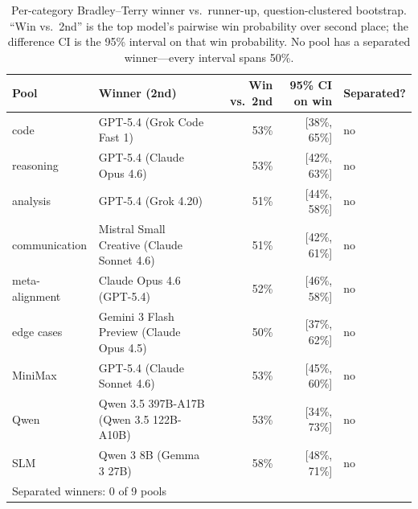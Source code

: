 \begin{table}[h]\centering\small
\caption{Per-category Bradley--Terry winner vs.\ runner-up, question-clustered bootstrap. ``Win vs.\ 2nd'' is the top model's pairwise win probability over second place; the difference CI is the 95\% interval on that win probability. No pool has a separated winner---every interval spans 50\%.}
\label{tab:percat}
\begin{tabular}{llrrl}
\toprule
Pool & Winner (2nd) & Win vs.\ 2nd & 95\% CI on win & Separated? \\
\midrule
code & GPT-5.4 (Grok Code Fast 1) & 53\% & [38\%, 65\%] & no \\
reasoning & GPT-5.4 (Claude Opus 4.6) & 53\% & [42\%, 63\%] & no \\
analysis & GPT-5.4 (Grok 4.20) & 51\% & [44\%, 58\%] & no \\
communication & Mistral Small Creative (Claude Sonnet 4.6) & 51\% & [42\%, 61\%] & no \\
meta-alignment & Claude Opus 4.6 (GPT-5.4) & 52\% & [46\%, 58\%] & no \\
edge cases & Gemini 3 Flash Preview (Claude Opus 4.5) & 50\% & [37\%, 62\%] & no \\
MiniMax & GPT-5.4 (Claude Sonnet 4.6) & 53\% & [45\%, 60\%] & no \\
Qwen & Qwen 3.5 397B-A17B (Qwen 3.5 122B-A10B) & 53\% & [34\%, 73\%] & no \\
SLM & Qwen 3 8B (Gemma 3 27B) & 58\% & [48\%, 71\%] & no \\
\midrule
\multicolumn{5}{l}{Separated winners: 0 of 9 pools} \\
\bottomrule
\end{tabular}
\end{table}